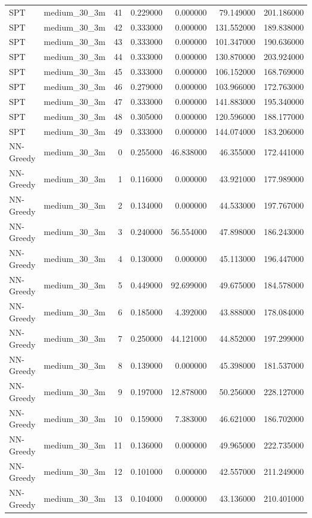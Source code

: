 \begin{tabular}{llrrrrr}
SPT & medium_30_3m & 41 & 0.229000 & 0.000000 & 79.149000 & 201.186000 \\
SPT & medium_30_3m & 42 & 0.333000 & 0.000000 & 131.552000 & 189.838000 \\
SPT & medium_30_3m & 43 & 0.333000 & 0.000000 & 101.347000 & 190.636000 \\
SPT & medium_30_3m & 44 & 0.333000 & 0.000000 & 130.870000 & 203.924000 \\
SPT & medium_30_3m & 45 & 0.333000 & 0.000000 & 106.152000 & 168.769000 \\
SPT & medium_30_3m & 46 & 0.279000 & 0.000000 & 103.966000 & 172.763000 \\
SPT & medium_30_3m & 47 & 0.333000 & 0.000000 & 141.883000 & 195.340000 \\
SPT & medium_30_3m & 48 & 0.305000 & 0.000000 & 120.596000 & 188.177000 \\
SPT & medium_30_3m & 49 & 0.333000 & 0.000000 & 144.074000 & 183.206000 \\
NN-Greedy & medium_30_3m & 0 & 0.255000 & 46.838000 & 46.355000 & 172.441000 \\
NN-Greedy & medium_30_3m & 1 & 0.116000 & 0.000000 & 43.921000 & 177.989000 \\
NN-Greedy & medium_30_3m & 2 & 0.134000 & 0.000000 & 44.533000 & 197.767000 \\
NN-Greedy & medium_30_3m & 3 & 0.240000 & 56.554000 & 47.898000 & 186.243000 \\
NN-Greedy & medium_30_3m & 4 & 0.130000 & 0.000000 & 45.113000 & 196.447000 \\
NN-Greedy & medium_30_3m & 5 & 0.449000 & 92.699000 & 49.675000 & 184.578000 \\
NN-Greedy & medium_30_3m & 6 & 0.185000 & 4.392000 & 43.888000 & 178.084000 \\
NN-Greedy & medium_30_3m & 7 & 0.250000 & 44.121000 & 44.852000 & 197.299000 \\
NN-Greedy & medium_30_3m & 8 & 0.139000 & 0.000000 & 45.398000 & 181.537000 \\
NN-Greedy & medium_30_3m & 9 & 0.197000 & 12.878000 & 50.256000 & 228.127000 \\
NN-Greedy & medium_30_3m & 10 & 0.159000 & 7.383000 & 46.621000 & 186.702000 \\
NN-Greedy & medium_30_3m & 11 & 0.136000 & 0.000000 & 49.965000 & 222.735000 \\
NN-Greedy & medium_30_3m & 12 & 0.101000 & 0.000000 & 42.557000 & 211.249000 \\
NN-Greedy & medium_30_3m & 13 & 0.104000 & 0.000000 & 43.136000 & 210.401000 \\

\end{tabular}
